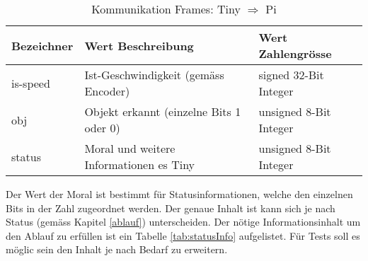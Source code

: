 \documentclass[../../main.tex]{subfiles}
\begin{document}
    \begin{table}[H] \centering
        \begin{tabular}{|l|l|l|}
        \hline
        \textbf{Bezeichner} & \textbf{Wert Beschreibung}                                  & \textbf{Wert Zahlengrösse} \\ \hline
        is-speed            & Ist-Geschwindigkeit (gemäss Encoder)                        & signed 32-Bit Integer      \\ \hline
        obj                 & Objekt erkannt (einzelne Bits 1 oder 0)                     & unsigned 8-Bit Integer     \\ \hline
        status              & Moral und weitere Informationen es Tiny                     & unsigned 8-Bit Integer     \\ \hline
        \end{tabular}
        
        \caption{Kommunikation Frames: Tiny $\Rightarrow$ Pi}
        \label{tab:com_tiny_pi}
        \end{table}
        
        Der Wert der Moral ist bestimmt für Statusinformationen, welche den einzelnen Bits in der Zahl zugeordnet werden. Der genaue Inhalt ist kann sich je nach Status (gemäss Kapitel \ref{ablauf}) unterscheiden. Der nötige Informationsinhalt um den Ablauf zu erfüllen ist ein Tabelle \ref{tab:statusInfo} aufgelistet. Für Tests soll es möglic sein den Inhalt je nach Bedarf zu erweitern.
        
\end{document}
